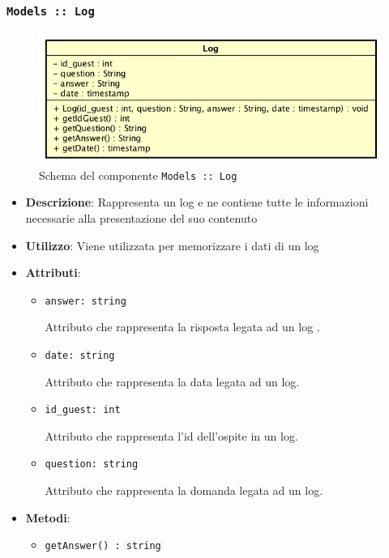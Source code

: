 \documentclass[../DefinizioneDiProdotto.tex]{subfiles}
\begin{document}
\begin{itemize}
	\newpage
	\subsubsection{\texttt{Models :: Log}}
	\begin{figure}[!h]
		\centering
		\includegraphics[scale=0.7]{Architettura/Models/Log.png}
		\caption{Schema del componente \texttt{Models :: Log}}
	\end{figure}
	\begin{itemize}\item \textbf{Descrizione}: Rappresenta un log e ne contiene tutte le informazioni necessarie alla presentazione del suo contenuto
	\item \textbf{Utilizzo}: Viene utilizzata per memorizzare i dati di un log
	\item \textbf{Attributi}:
	\begin{itemize}
	\item \texttt{answer: string}\

	 Attributo che rappresenta la risposta legata ad un log
	.
	\end{itemize}
	\begin{itemize}
	\item \texttt{date: string}\

	 Attributo che rappresenta la data legata ad un log.
	\end{itemize}
	\begin{itemize}
	\item \texttt{id\_guest: int}\

	 Attributo che rappresenta l'id dell'ospite in un log.
	\end{itemize}
	\begin{itemize}
	\item \texttt{question: string}\

	 Attributo che rappresenta la domanda legata ad un log.
	\end{itemize}
	\item \textbf{Metodi}:
	\begin{itemize}
	\item \texttt{getAnswer() : string}\


\end{itemize}
\end{itemize}
\end{itemize}
\end{document}
